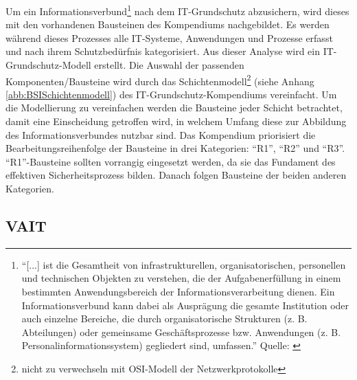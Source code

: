 Um ein Informationsverbund\footnote{\enquote{[...] ist die Gesamtheit von infrastrukturellen, organisatorischen, personellen und technischen Objekten zu verstehen, die der Aufgabenerfüllung in einem bestimmten Anwendungsbereich der Informationsverarbeitung dienen. Ein Informationsverbund kann dabei als Ausprägung die gesamte Institution oder	auch einzelne Bereiche, die durch organisatorische Strukturen (z. B. Abteilungen) oder gemeinsame Geschäftsprozesse bzw. Anwendungen (z. B. Personalinformationssystem) gegliedert sind, umfassen.} Quelle: \cite[][S.37]{bundesamt_fur_sicherheit_in_der_informationstechnik_bsi_it-grundschutz-kompendium_2020}} nach dem IT-Grundschutz abzusichern, wird dieses mit den vorhandenen Bausteinen des Kompendiums nachgebildet. Es werden während dieses Prozesses alle IT-Systeme, Anwendungen und Prozesse erfasst und nach ihrem Schutzbedürfnis kategorisiert. Aus dieser Analyse wird ein IT-Grundschutz-Modell erstellt. Die Auswahl der passenden Komponenten/Bausteine wird durch das Schichtenmodell\footnote{nicht zu verwechseln mit \ac{OSI}-Modell der Netzwerkprotokolle} (siehe Anhang \vref{abb:BSISchichtenmodell}) des IT-Grundschutz-Kompendiums vereinfacht. Um die Modellierung zu vereinfachen werden die Bausteine jeder Schicht betrachtet, damit eine Einscheidung getroffen wird, in welchem Umfang diese zur Abbildung des Informationsverbundes nutzbar sind. Das Kompendium priorisiert die Bearbeitungsreihenfolge der Bausteine in drei Kategorien: \enquote{R1}, \enquote{R2} und \enquote{R3}. \enquote{R1}-Bausteine sollten vorrangig eingesetzt werden, da sie das Fundament des effektiven Sicherheitsprozess bilden. Danach folgen Bausteine der beiden anderen Kategorien.

\subsection{\ac{VAIT}}


